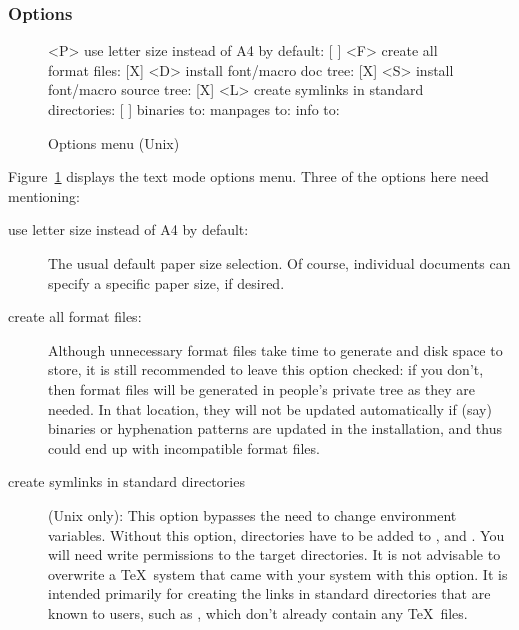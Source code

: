 \documentclass{article}
\begin{document}
\subsubsection{Options}
\label{sec:options}

\begin{figure}[tbh]
\begin{boxedverbatim}
<P> use letter size instead of A4 by default: [ ]
<F> create all format files:                  [X]
<D> install font/macro doc tree:              [X]
<S> install font/macro source tree:           [X]
<L> create symlinks in standard directories:  [ ]
           binaries to:
           manpages to:
               info to:
\end{boxedverbatim}
\caption{Options menu (Unix)}\label{fig:options-text}
\end{figure}

Figure~\ref{fig:options-text} displays the text mode options menu.
Three of the options here need mentioning:

\begin{description}
\item[use letter size instead of A4 by default:] The usual default paper
  size selection.  Of course, individual documents can specify a specific
  paper size, if desired.

\item[create all format files:] Although unnecessary format files
  take time to generate and disk space to store, it is still recommended
  to leave this option checked: if you don't, then format files will be
  generated in people's private  tree as they are
  needed.  In that location, they will not be updated automatically if
  (say) binaries or hyphenation patterns are updated in the
  installation, and thus could end up with incompatible format files.

\item[create symlinks in standard directories] (Unix only):
  This option bypasses the need to change environment
  variables. Without this option, \TL{} directories have to be added
  to ,  and . You will
  need write permissions to the target directories.  It is not
  advisable to overwrite a \TeX\ system that came with your system
  with this option.  It is intended primarily for creating the links
  in standard directories that are known to users, such as
  , which don't already contain any
  \TeX\ files.
\end{description}
\end{document}

